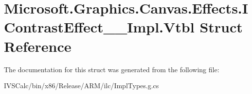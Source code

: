 \hypertarget{struct_microsoft_1_1_graphics_1_1_canvas_1_1_effects_1_1_i_contrast_effect_____impl_1_1_vtbl}{}\section{Microsoft.\+Graphics.\+Canvas.\+Effects.\+I\+Contrast\+Effect\+\_\+\+\_\+\+Impl.\+Vtbl Struct Reference}
\label{struct_microsoft_1_1_graphics_1_1_canvas_1_1_effects_1_1_i_contrast_effect_____impl_1_1_vtbl}


The documentation for this struct was generated from the following file\+:\begin{DoxyCompactItemize}
\item 
I\+V\+S\+Calc/bin/x86/\+Release/\+A\+R\+M/ilc/Impl\+Types.\+g.\+cs\end{DoxyCompactItemize}
